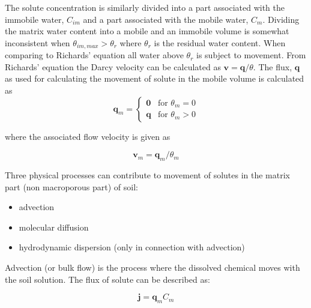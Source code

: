 \documentclass{report}
\begin{document}


The solute concentration is similarly divided into a part associated
with the immobile water, $C_{im}$ and a part associated with the
mobile water, $C_{m}$. Dividing the matrix water content into a
mobile and an immobile volume is somewhat inconsistent when
$\theta_{im,max}>\theta_r$ where $\theta_r$ is the residual water
content. When comparing to Richards' equation all water above
$\theta_r$ is subject to movement. From Richards' equation the Darcy
velocity can be calculated as $\mathbf{v}=\mathbf{q}/\theta$. The
flux, $\mathbf{q}$ as used for calculating the movement of solute in
the mobile volume is calculated as
%
\begin{equation}
\mathbf{q}_{m} =
\begin{cases}
\mathbf{0} & \text{for\ } \theta_{m} = 0 \\
\mathbf{q} & \text{for\ } \theta_{m} > 0
\end{cases}
\end{equation}


%
where the associated flow velocity is given as

\begin{equation}
\mathbf{v}_{m}=\mathbf{q}_{m}/\theta_{m}
\end{equation}

Three physical processes can contribute to movement of solutes in
the matrix part (non macroporous part) of soil:

\begin{itemize}
\item advection
\item molecular diffusion
\item hydrodynamic dispersion (only in connection
  with advection)
\end{itemize}

Advection (or bulk flow) is the
process where the dissolved chemical moves with the soil solution.
The flux of solute can be described as:

\begin{equation}
\mathbf{j}=\mathbf{q}_{m}C_{m}
\end{equation}
\end{document}
